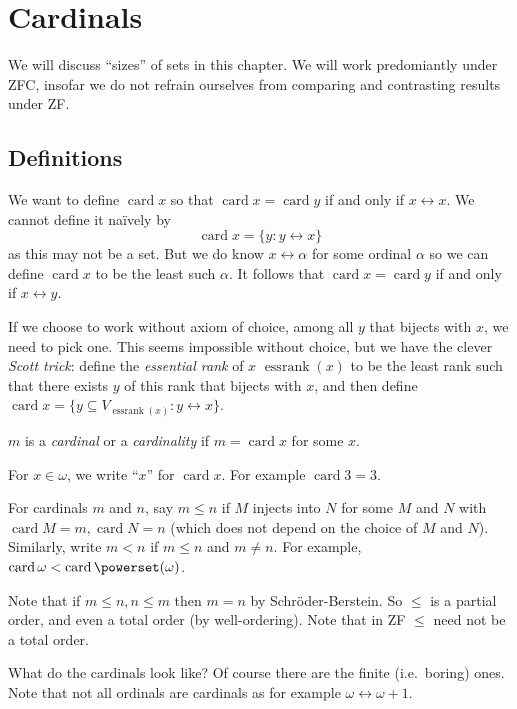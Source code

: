 \documentclass[a4paper]{article}
\DeclareMathOperator{\card}{card}
\newcommand*{\biject}{\leftrightarrow}
\begin{document}
\section{Cardinals}

We will discuss ``sizes'' of sets in this chapter. We will work predomiantly under ZFC, insofar we do not refrain ourselves from comparing and contrasting results under ZF.

\subsection{Definitions}

We want to define \(\card x\) so that \(\card x = \card y\) if and only if \(x \biject x\). We cannot define it naïvely by
\[
  \card x = \{y: y \biject x\}
\]
as this may not be a set. But we do know \(x \biject \alpha\) for some ordinal \(\alpha\) so we can define \(\card x\) to be the least such \(\alpha\). It follows that \(\card x = \card y\) if and only if \(x \biject y\).

If we choose to work without axiom of choice, among all \(y\) that bijects with \(x\), we need to pick one. This seems impossible without choice, but we have the clever \emph{Scott trick}: define the \emph{essential rank} of \(x\) \(\operatorname{essrank}(x)\) to be the least rank such that there exists \(y\) of this rank that bijects with \(x\), and then define \(\card x = \{y \subseteq V_{\operatorname{essrank}(x)}: y \biject x\}\).

\begin{definition}[Cardinal]
  \(m\) is a \emph{cardinal} or a \emph{cardinality} if \(m = \card x\) for some \(x\).
\end{definition}

For \(x \in \omega\), we write ``\(x\)'' for \(\card x\). For example \(\card 3 = 3\).

For cardinals \(m\) and \(n\), say \(m \leq n\) if \(M\) injects into \(N\) for some \(M\) and \(N\) with \(\card M = m, \card N = n\) (which does not depend on the choice of \(M\) and \(N\)). Similarly, write \(m < n\) if \(m \leq n\) and \(m \neq n\). For example, \(\card \omega < \card \powerset(\omega)\).

Note that if \(m \leq n, n \leq m\) then \(m = n\) by Schröder-Berstein. So \(\leq\) is a partial order, and even a total order (by well-ordering). Note that in ZF \(\leq\) need not be a total order.

What do the cardinals look like? Of course there are the finite (i.e.\ boring) ones. Note that not all ordinals are cardinals as for example \(\omega \biject \omega + 1\).
\end{document}
